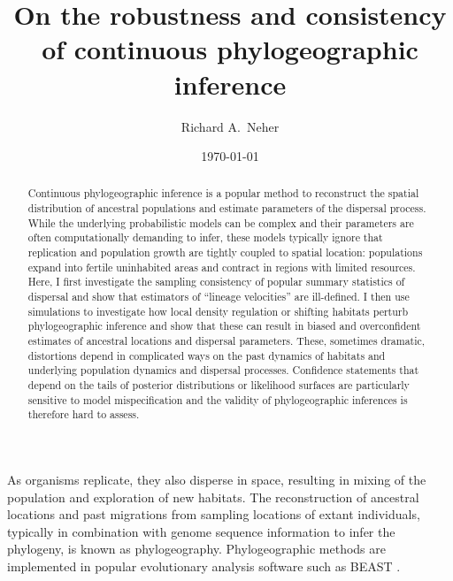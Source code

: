 \documentclass[aps,rmp, twocolumn]{revtex4}
\begin{document}
\title{On the robustness and consistency of continuous phylogeographic inference}
\author{Richard A.~Neher}

\date{\today}
\begin{abstract}
Continuous phylogeographic inference is a popular method to reconstruct the spatial distribution of ancestral populations and estimate parameters of the dispersal process.
While the underlying probabilistic models can be complex and their parameters are often computationally demanding to infer, these models typically ignore that replication and population growth are tightly coupled to spatial location: populations expand into fertile uninhabited areas and contract in regions with limited resources.
Here, I first investigate the sampling consistency of popular summary statistics of dispersal and show that estimators of ``lineage velocities'' are ill-defined.
I then use simulations to investigate how local density regulation or shifting habitats perturb phylogeographic inference and show that these can result in biased and overconfident estimates of ancestral locations and dispersal parameters.
These, sometimes dramatic, distortions depend in complicated ways on the past dynamics of habitats and underlying population dynamics and dispersal processes.
Confidence statements that depend on the tails of posterior distributions or likelihood surfaces are particularly sensitive to model mispecification and the validity of phylogeographic inferences is therefore hard to assess.
\end{abstract}

\maketitle
As organisms replicate, they also disperse in space, resulting in mixing of the population and exploration of new habitats.
The reconstruction of ancestral locations and past migrations from sampling locations of extant individuals, typically in combination with genome sequence information to infer the phylogeny, is known as phylogeography.
Phylogeographic methods are implemented in popular evolutionary analysis software such as BEAST \citep{lemey_bayesian_2009,lemey_phylogeography_2010}.
\end{document}
